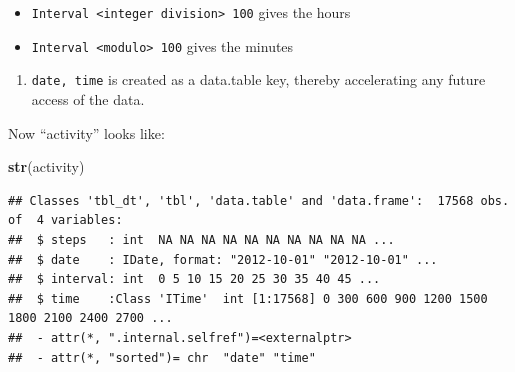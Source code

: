 \documentclass[]{article}
\newenvironment{Shaded}{\begin{snugshade}}{\end{snugshade}}
\newcommand{\KeywordTok}[1]{\textcolor[rgb]{0.13,0.29,0.53}{\textbf{{#1}}}}
\newcommand{\DataTypeTok}[1]{\textcolor[rgb]{0.13,0.29,0.53}{{#1}}}
\newcommand{\DecValTok}[1]{\textcolor[rgb]{0.00,0.00,0.81}{{#1}}}
\newcommand{\StringTok}[1]{\textcolor[rgb]{0.31,0.60,0.02}{{#1}}}
\newcommand{\CommentTok}[1]{\textcolor[rgb]{0.56,0.35,0.01}{\textit{{#1}}}}
\newcommand{\NormalTok}[1]{{#1}}
\begin{document}
\begin{itemize}
\itemsep1pt\parskip0pt
\item
  \texttt{Interval \textless{}integer division\textgreater{} 100} gives
  the hours
\item
  \texttt{Interval \textless{}modulo\textgreater{} 100} gives the
  minutes
\end{itemize}

\begin{enumerate}
\def\labelenumi{\arabic{enumi}.}
\setcounter{enumi}{2}
\itemsep1pt\parskip0pt
\item
  \texttt{date, time} is created as a data.table key, thereby
  accelerating any future access of the data.
\end{enumerate}

\begin{Shaded}
\end{Shaded}

Now ``activity'' looks like:

\begin{Shaded}
\begin{Highlighting}[]
\KeywordTok{str}\NormalTok{(activity)}
\end{Highlighting}
\end{Shaded}

\begin{verbatim}
## Classes 'tbl_dt', 'tbl', 'data.table' and 'data.frame':  17568 obs. of  4 variables:
##  $ steps   : int  NA NA NA NA NA NA NA NA NA NA ...
##  $ date    : IDate, format: "2012-10-01" "2012-10-01" ...
##  $ interval: int  0 5 10 15 20 25 30 35 40 45 ...
##  $ time    :Class 'ITime'  int [1:17568] 0 300 600 900 1200 1500 1800 2100 2400 2700 ...
##  - attr(*, ".internal.selfref")=<externalptr> 
##  - attr(*, "sorted")= chr  "date" "time"
\end{verbatim}
\end{document}
